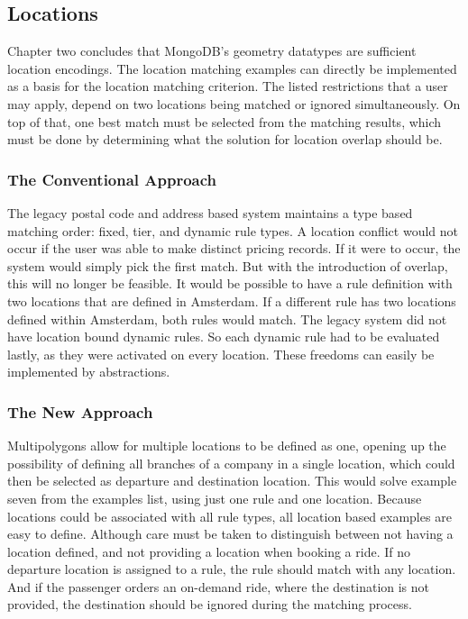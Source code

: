 \subsection{Locations}
Chapter two concludes that MongoDB's geometry datatypes are sufficient location encodings. The location matching examples can directly be implemented as a basis for the location matching criterion. The listed restrictions that a user may apply, depend on two locations being matched or ignored simultaneously. On top of that, one best match must be selected from the matching results, which must be done by determining what the solution for location overlap should be.

\subsubsection{The Conventional Approach}
The legacy postal code and address based system maintains a type based matching order: fixed, tier, and dynamic rule types. A location conflict would not occur if the user was able to make distinct pricing records. If it were to occur, the system would simply pick the first match. But with the introduction of overlap, this will no longer be feasible. It would be possible to have a rule definition with two locations that are defined in Amsterdam. If a different rule has two locations defined within Amsterdam, both rules would match. The legacy system did not have location bound dynamic rules. So each dynamic rule had to be evaluated lastly, as they were activated on every location. These freedoms can easily be implemented by abstractions.

\subsubsection{The New Approach}
Multipolygons allow for multiple locations to be defined as one, opening up the possibility of defining all branches of a company in a single location, which could then be selected as departure and destination location. This would solve example seven from the examples list, using just one rule and one location. Because locations could be associated with all rule types, all location based examples are easy to define. Although care must be taken to distinguish between not having a location defined, and not providing a location when booking a ride. If no departure location is assigned to a rule, the rule should match with any location. And if the passenger orders an on-demand ride, where the destination is not provided, the destination should be ignored during the matching process.

